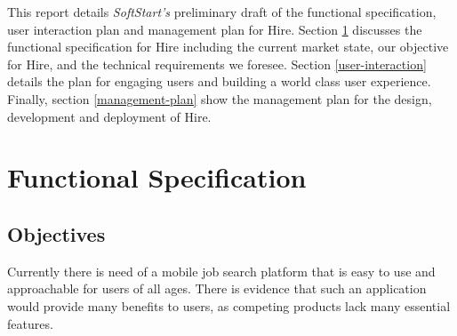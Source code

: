 \documentclass[11pt]{article}
\begin{document}

This report details \textit{SoftStart's} preliminary draft of the functional specification, user interaction plan and management plan for Hire. Section \ref{functional-spec} discusses the functional specification for Hire including the current market state, our objective for Hire, and the technical requirements we foresee. Section \ref{user-interaction} details the plan for engaging users and building a world class user experience. Finally, section \ref{management-plan} show the management plan for the design, development and deployment of Hire.

%
\section{Functional Specification}\label{functional-spec}



\subsection{Objectives}

Currently there is need of a mobile job search platform that is easy to use and approachable for users of all ages. There is evidence that such an application would provide many benefits to users, as competing products lack many essential features.
\end{document}
